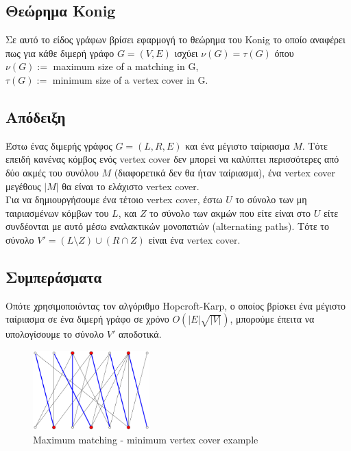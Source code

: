 \subsection{Θεώρημα Konig}

Σε αυτό το είδος γράφων βρίσει εφαρμογή το θεώρημα του Konig το οποίο αναφέρει πως για κάθε διμερή γράφο $G=(V,E)$ ισχύει $\nu(G) = \tau(G)$ όπου\\
$\nu(G) := $ maximum size of a matching in G,\\
$\tau(G) := $ minimum size of a vertex cover in G.

\subsection{Απόδειξη}
\justify
Έστω ένας διμερής γράφος $G = (L, R, E)$ και ένα μέγιστο ταίριασμα $M$. Τότε επειδή κανένας κόμβος ενός vertex cover δεν μπορεί να καλύπτει περισσότερες από δύο ακμές του συνόλου $M$ (διαφορετικά δεν θα ήταν ταίριασμα), ένα vertex cover μεγέθους $|M|$ θα είναι το ελάχιστο vertex cover.\\
Για να δημιουργήσουμε ένα τέτοιο vertex cover, έστω $U$ το σύνολο των μη ταιριασμένων κόμβων του $L$, και $Z$ το σύνολο των ακμών που είτε είναι στο $U$ είτε συνδέονται με αυτό μέσω εναλακτικών μονοπατιών (alternating paths). Τότε το σύνολο $V' = (L \setminus Z) \cup (R \cap Z)$ είναι ένα vertex cover. 

\subsection{Συμπεράσματα}

Οπότε χρησιμοποιόντας τον αλγόριθμο Hopcroft-Karp, ο οποίος βρίσκει ένα μέγιστο ταίριασμα σε ένα διμερή γράφο σε χρόνο $O(|E| \sqrt{|V|})$, μπορούμε έπειτα να υπολογίσουμε το σύνολο $V'$ αποδοτικά.

\begin{figure}[H]
\caption{Maximum matching - minimum vertex cover example}
\centering
\includegraphics[width=0.4\textwidth]{Figures/KonigTheo.png}\centering
\end{figure}

